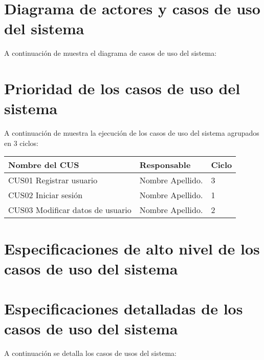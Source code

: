 \section{Diagrama de actores y casos de uso del sistema}

A continuación de muestra el diagrama de casos de uso del sistema:

 
\section{Prioridad de los casos de uso del sistema}

A continuación de muestra la ejecución de los casos de uso del sistema agrupados en 3 ciclos:
	\begin{table}[h!]	
		\begin{tabular}{ |p{4cm}|p{7cm}|p{3cm}| }	\hline
			
			\rowcolor{gray!50}  \textbf{Nombre del CUS}  &  \textbf{Responsable } &  \textbf{Ciclo} \\ \hline
			
			CUS01 Registrar usuario  &  Nombre Apellido. &  3   \\	\hline
			
			CUS02 Iniciar sesión  &  Nombre Apellido. &  1   \\	\hline
		
			CUS03 Modificar datos de usuario  &  Nombre Apellido. &  2   \\	\hline
			
		\end{tabular}
	\end{table}	


\section{Especificaciones de alto nivel de los casos de uso del sistema}

\section{Especificaciones detalladas de los casos de uso del sistema}

A continuación se detalla los casos de usos del sistema:

